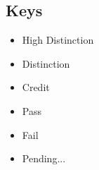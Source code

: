 \documentclass[12pt,a4paper,oneside]{article}
\newcommand{\uniHD}[1]{\colorbox{blue!25}{#1}}
\newcommand{\uniD}[1]{\colorbox{green!25}{#1}}
\newcommand{\uniC}[1]{\colorbox{yellow!25}{#1}}
\newcommand{\uniP}[1]{\colorbox{orange!25}{#1}}
\newcommand{\uniF}[1]{\colorbox{red!25}{#1}}
\newcommand{\uniU}[1]{\colorbox{gray!25}{#1}}
\begin{document}
\setcounter{subsection}{-1}
\subsection{Keys}
\begin{multicols}{3}
\begin{itemize}
    \item \uniHD{High Distinction}
    \item \uniD{Distinction}
    \item \uniC{Credit}
    \item \uniP{Pass}
    \item \uniF{Fail}
    \item \uniU{Pending...}
\end{itemize}
\end{multicols}
\newpage
\addtocounter{subsection}{1}
{}
\addtocounter{subsection}{-1}
\end{document}
